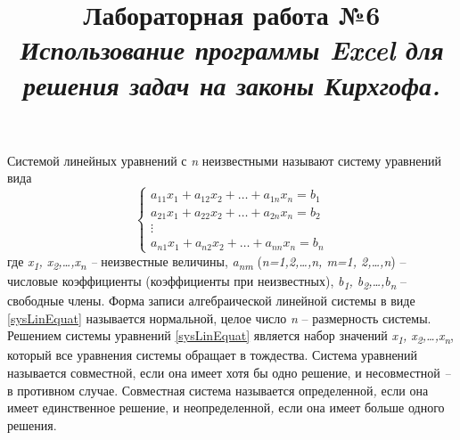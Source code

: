 \documentclass[14pt,a4paper]{article}
\title{Лабораторная работа №6 \\ \textit{Использование программы Excel для решения задач на законы Кирхгофа.}}
\begin{document}
\maketitle
Системой линейных уравнений с \emph{n} неизвестными называют систему
уравнений вида
\begin{equation} \label{sysLinEquat}
    \begin{cases}
        a_{11}x_1 + a_{12}x_2 + \ldots + a_{1n}x_n = b_1 \\
        a_{21}x_1 + a_{22}x_2 + \ldots + a_{2n}x_n = b_2 \\
        \vdots \\
        a_{n1}x_1 + a_{n2}x_2 + \ldots + a_{nn}x_n = b_n 
    \end{cases}
\end{equation}
где \emph{x\textsubscript{1},
x\textsubscript{2},\ldots,x\textsubscript{n} --} неизвестные величины,
\emph{a\textsubscript{nm}} (\emph{n=1,2,\ldots,n, m=1, 2,\ldots,n}) --
числовые коэффициенты (коэффициенты при неизвестных),
\emph{b\textsubscript{1}, b\textsubscript{2},\ldots,b\textsubscript{n}}
-- свободные члены. Форма записи алгебраической линейной системы в виде
\ref{sysLinEquat} называется нормальной, целое число \emph{n} -- размерность системы.
Решением системы уравнений \ref{sysLinEquat} является набор значений
\emph{x\textsubscript{1}, x\textsubscript{2},\ldots,x\textsubscript{n}},
который все уравнения системы обращает в тождества. Система уравнений
называется совместной, если она имеет хотя бы одно решение, и
несовместной \emph{--} в противном случае. Совместная система называется
определенной\emph{,} если она имеет единственное решение, и
неопределенной\emph{,} если она имеет больше одного решения.
\end{document}
